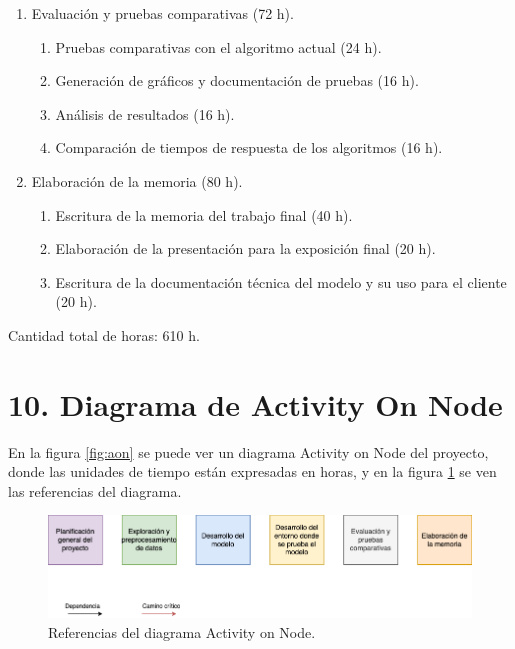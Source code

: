 \documentclass[
11pt, %
]{charter}
\begin{document}
\begin{enumerate}
\item Evaluación y pruebas comparativas (72 h).
	\begin{enumerate}
	\item Pruebas comparativas con el algoritmo actual (24 h).
	\item Generación de gráficos y documentación de pruebas (16 h).
	\item Análisis de resultados (16 h).
	\item Comparación de tiempos de respuesta de los algoritmos (16 h).
	\end{enumerate}
\item Elaboración de la memoria (80 h).
	\begin{enumerate}
	\item Escritura de la memoria del trabajo final (40 h).
	\item Elaboración de la presentación para la exposición final (20 h).
	\item Escritura de la documentación técnica del modelo y su uso para el cliente (20 h).
	\end{enumerate}
\end{enumerate}

Cantidad total de horas: 610 h.

\section{10. Diagrama de Activity On Node}
\label{sec:AoN}

En la figura \ref{fig:aon} se puede ver un diagrama Activity on Node del proyecto, donde las unidades de tiempo están expresadas en horas, y en la figura \ref{fig:aon_referencias} se ven las referencias del diagrama.

\begin{figure}[htpb]
	\centering 
	\includegraphics[width=1.05\textwidth]{./Figuras/amrra-aon-referencias.png}
	\caption{Referencias del diagrama Activity on Node.}
	\label{fig:aon_referencias}
\end{figure}
\end{document}
